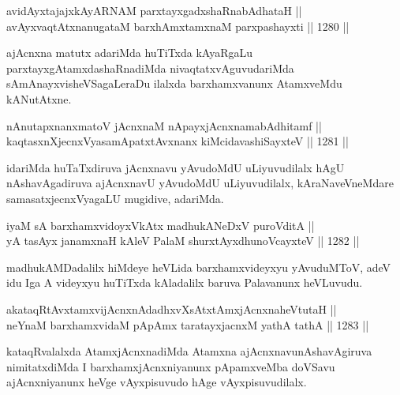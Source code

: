 \begin{shl}
avidAyxtajajxkAyARNAM parxtayxgadxshaRnabAdhataH || \\
avAyxvaqtAtxnanugataM barxhAmxtamxnaM parxpashayxti \hfill || 1280 ||  
\end{shl}

\begin{artha}
ajAcnxna matutx adariMda huTiTxda kAyaRgaLu parxtayxgAtamxdashaRnadiMda nivaqtatxvAguvudariMda sAmAnayxvisheVSagaLeraDu ilalxda barxhamxvanunx AtamxveMdu kANutAtxne.
\end{artha}

\begin{shl}
nAnutapxnanxmatoV jAcnxnaM nApayxjAcnxnamabAdhitamf ||  \\
kaqtasxnXjecnxVyasamApatxtAvxnanx kiMcidavashiSayxteV \hfill || 1281 ||  
\end{shl}

\begin{artha}
idariMda huTaTxdiruva jAcnxnavu yAvudoMdU uLiyuvudilalx hAgU nAshavAgadiruva ajAcnxnavU yAvudoMdU uLiyuvudilalx, kAraNaveVneMdare samasatxjecnxVyagaLU mugidive, adariMda.
\end{artha}

\begin{shl}
iyaM sA barxhamxvidoyxVkAtx madhukANeDxV puroVditA ||  \\
yA tasAyx janamxnaH kAleV PalaM shurxtAyx\s dhunoVcayxteV || 1282 ||  
\end{shl}

\begin{artha}
madhukAMDadalilx hiMdeye heVLida barxhamxvideyxyu yAvuduMToV, adeV idu Iga A videyxyu huTiTxda kAladalilx baruva Palavanunx heVLuvudu.
\end{artha}


\begin{shl}
akataqRtAvxtamxvijAcnxnAdadhxvXsAtxtAmxjAcnxnaheVtutaH || \\
neYnaM barxhamxvidaM pApAmx taratayxjacnxM yathA tathA \hfill || 1283 ||  
\end{shl}

\begin{artha}
kataqRvalalxda AtamxjAcnxnadiMda Atamxna ajAcnxnavunAshavAgiruva nimitatxdiMda I barxhamxjAcnxniyanunx pApamxveMba doVSavu ajAcnxniyanunx heVge vAyxpisuvudo hAge vAyxpisuvudilalx.
\end{artha}


